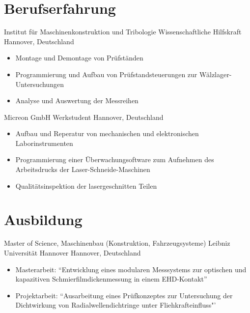 \documentclass[11pt,a4paper,sans]{moderncv}
\begin{document}
\section{\textbf{Berufserfahrung}}

{Institut für Maschinenkonstruktion und Tribologie}
{Wissenschaftliche Hilfskraft}
{Hannover, Deutschland}
{}
{
    \begin{itemize}
        \item Montage und Demontage von Prüfständen
        \item Programmierung und Aufbau von Prüfstandsteuerungen zur Wälzlager-Untersuchungen
        \item Analyse und Auswertung der Messreihen
    \end{itemize}
}

{Micreon GmbH}
{Werkstudent}
{Hannover, Deutschland}
{}
{
    \begin{itemize}
        \item Aufbau und Reperatur von mechanischen und elektronischen Laborinstrumenten
        \item Programmierung einer Überwachungsoftware zum Aufnehmen des Arbeitsdrucks der Laser-Schneide-Maschinen
        \item Qualitätsinspektion der lasergeschnitten Teilen
    \end{itemize}
}



\section{\textbf{Ausbildung}}

{Master of Science, Maschinenbau (Konstruktion, Fahrzeugsysteme)}
{Leibniz Universität Hannover}
{Hannover, Deutschland}
{}
{
    \begin{itemize}
        \item Masterarbeit: ``Entwicklung eines modularen Messsystems zur optischen und kapazitiven Schmierfilmdicken\-messung in einem EHD-Kontakt''
        \item Projektarbeit: ``Ausarbeitung eines Prüfkonzeptes zur Untersuchung der Dichtwirkung von Radialwellendichtringe unter Fliehkrafteinfluss"'
    \end{itemize}
}
\end{document}
